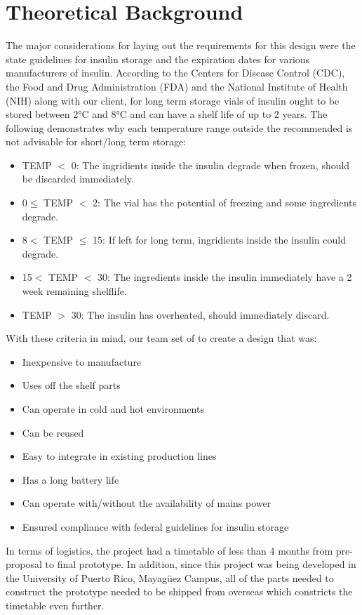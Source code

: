\section{Theoretical Background}
The major considerations for laying out the requirements for this design were the state guidelines for insulin storage and the expiration dates for various manufacturers of insulin. According to the Centers for Disease Control (CDC)\cite{ManagingInsulinEmergency2022}, the Food and Drug Administration (FDA) \cite{researchInformationRegardingInsulin2018} and the National Institute of Health (NIH) \cite{bahendekaEADSGGuidelinesInsulin2019} along with our client, for long term storage vials of insulin ought to be stored between 2\si{\celsius} and 8\si{\celsius} and can have a shelf life of up to 2 years. The following demonstrates why each temperature range outside the recommended is not advisable for short/long term storage:
\begin{itemize}
  \item TEMP $<$ 0\textcelsius: The ingridients inside the insulin degrade when frozen, should be discarded immediately.
  \item 0\textcelsius $\leq$ TEMP $<$ 2\textcelsius: The vial has the potential of freezing and some ingredients degrade.
  \item 8\textcelsius $<$ TEMP $\leq$ 15\textcelsius: If left for long term, ingridients inside the insulin could degrade.
  \item 15\textcelsius $<$ TEMP $<$ 30\textcelsius: The ingredients inside the insulin immediately have a 2 week remaining shelflife.
  \item TEMP $>$ 30\textcelsius: The insulin has overheated, should immediately discard.
\end{itemize}
With these criteria in mind, our team set of to create a design that was:
\begin{itemize}
  \item Inexpensive to manufacture
  \item Uses off the shelf parts
  \item Can operate in cold and hot environments
  \item Can be reused
  \item Easy to integrate in existing production lines
  \item Has a long battery life
  \item Can operate with/without the availability of mains power
  \item Ensured compliance with federal guidelines for insulin storage
\end{itemize}
In terms of logistics, the project had a timetable of less than 4 months from pre-proposal to final prototype. In addition, since this project was being developed in the University of Puerto Rico, Mayagüez Campus, all of the parts needed to construct the prototype needed to be shipped from overseas which constricts the timetable even further.\\
